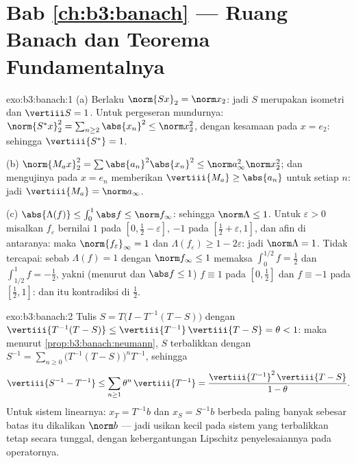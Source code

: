 \section*{Bab \ref{ch:b3:banach} --- Ruang Banach dan
Teorema Fundamentalnya}

\begin{solution}{exo:b3:banach:1}
(a) Berlaku $\norm{Sx}_2 = \norm x_2$: jadi $S$ merupakan isometri dan $\vertiii S =
1$. Untuk pergeseran mundurnya: $\norm{S^*x}_2^2 = \sum_{n \geq
2}\abs{x_n}^2 \leq \norm x_2^2$, dengan kesamaan pada $x = e_2$:
sehingga $\vertiii{S^*} = 1$.

(b) $\norm{M_ax}_2^2 = \sum\abs{a_n}^2\abs{x_n}^2 \leq \norm
a_\infty^2\norm x_2^2$; dan mengujinya pada $x = e_n$ memberikan $\vertiii{M_a}
\geq \abs{a_n}$ untuk setiap $n$: jadi $\vertiii{M_a} = \norm a_\infty$.

(c) $\abs{\Lambda(f)} \leq \int_0^1\abs f \leq \norm f_\infty$:
sehingga $\norm\Lambda \leq 1$. Untuk $\varepsilon > 0$ misalkan $f_\varepsilon$
bernilai $1$ pada $[0, \frac12 - \varepsilon]$, $-1$ pada $[\frac12 +
\varepsilon, 1]$, dan afin di antaranya: maka $\norm{f_\varepsilon}_\infty =
1$ dan $\Lambda(f_\varepsilon) \geq 1 - 2\varepsilon$: jadi
$\norm\Lambda = 1$. Tidak tercapai: sebab $\Lambda(f) = 1$ dengan $\norm
f_\infty \leq 1$ memaksa $\int_0^{1/2}f = \frac12$ dan
$\int_{1/2}^1 f = -\frac12$, yakni (menurut  dan $\abs f \leq 1$)
$f \equiv 1$ pada $[0, \frac12]$ dan $f \equiv -1$ pada $[\frac12,
1]$: dan itu kontradiksi di $\frac12$.
\end{solution}

\begin{solution}{exo:b3:banach:2}
Tulis $S = T\bigl(I - T^{-1}(T - S)\bigr)$ dengan
$\vertiii{T^{-1}(T-S)} \leq \vertiii{T^{-1}}\,\vertiii{T - S} =
\theta < 1$: maka menurut \cref{prop:b3:banach:neumann}, $S$ terbalikkan
dengan $S^{-1} = \sum_{n\geq0}\bigl(T^{-1}(T -
S)\bigr)^nT^{-1}$, sehingga
\[
\vertiii{S^{-1} - T^{-1}} \leq
\sum_{n\geq1}\theta^n\,\vertiii{T^{-1}}
= \frac{\vertiii{T^{-1}}^2\,\vertiii{T - S}}{1 - \theta}.
\]
Untuk sistem linearnya: $x_T = T^{-1}b$ dan $x_S = S^{-1}b$
berbeda paling banyak sebesar batas itu dikalikan $\norm b$ --- jadi usikan
kecil pada sistem yang terbalikkan tetap  secara tunggal,
dengan kebergantungan Lipschitz penyelesaiannya pada operatornya.
\end{solution}

